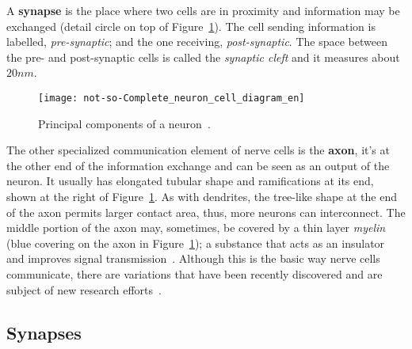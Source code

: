 A \textbf{synapse} is the place where two cells are in proximity and information may be exchanged (detail circle on top of Figure~\ref{fig:neuro:neuron-anatomy}). The cell sending information is labelled, \emph{pre-synaptic}; and the one receiving, \emph{post-synaptic}. The space between the pre- and post-synaptic cells is called the \emph{synaptic cleft} and it measures about $20 nm$. 

\begin{figure}
  \begin{center}
    \texttt{[image: not-so-Complete\_neuron\_cell\_diagram\_en]}
    \caption{Principal components of a neuron~\cite{wikipedia-images}.}
    \label{fig:neuro:neuron-anatomy}
  \end{center}
\end{figure}

The other specialized communication element of nerve cells is the \textbf{axon}, it's at the other end of the information exchange and can be seen as an output of the neuron. It usually has elongated tubular shape and ramifications at its end, shown at the right of Figure~\ref{fig:neuro:neuron-anatomy}. As with dendrites, the tree-like shape at the end of the axon permits larger contact area, thus, more neurons can interconnect. The middle portion of the axon may, sometimes, be covered by a thin layer \emph{myelin} (blue covering on the axon in Figure~\ref{fig:neuro:neuron-anatomy}); a substance that acts as an insulator and improves signal transmission~\cite{thompson2000brain}. Although this is the basic way nerve cells communicate, there are variations that have been recently discovered and are subject of new research efforts~\cite{Bullock04112005}.



\subsection{Synapses}

